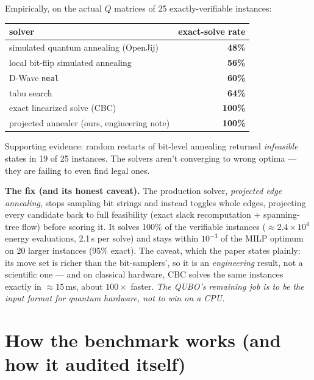 \documentclass[11pt]{article}
\newenvironment{card}{%
  \def\FrameCommand{\fboxsep=8pt\fcolorbox{cardline}{cardbg}}%
  \MakeFramed{\advance\hsize-\width\FrameRestore}\noindent}{\endMakeFramed}
\newcommand{\good}[1]{\textcolor{goodg}{\textbf{#1}}}
\newcommand{\bad}[1]{\textcolor{badr}{\textbf{#1}}}
\newcommand{\code}[1]{\texttt{#1}}
\begin{document}
Empirically, on the actual $Q$ matrices of 25 exactly-verifiable instances:

\begin{center}
\begin{tabular}{lr}
\toprule
solver & exact-solve rate \\
\midrule
simulated quantum annealing (OpenJij) & \bad{48\%} \\
local bit-flip simulated annealing & \bad{56\%} \\
D-Wave \code{neal} & \bad{60\%} \\
tabu search & \bad{64\%} \\
exact linearized solve (CBC) & \good{100\%} \\
projected annealer (ours, engineering note) & \good{100\%} \\
\bottomrule
\end{tabular}
\end{center}

Supporting evidence: random restarts of bit-level annealing returned
\emph{infeasible} states in 19 of 25 instances. The solvers aren't
converging to wrong optima --- they are failing to even find legal ones.

\begin{card}
\textbf{The fix (and its honest caveat).} The production solver,
\emph{projected edge annealing}, stops sampling bit strings and instead
toggles whole edges, projecting every candidate back to full feasibility
(exact slack recomputation + spanning-tree flow) before scoring it.
It solves 100\% of the verifiable instances ($\approx 2.4\times10^4$
energy evaluations, 2.1\,s per solve) and stays within $10^{-3}$ of the
MILP optimum on 20 larger instances (95\% exact). The caveat, which the
paper states plainly: its move set is richer than the bit-samplers', so it
is an \emph{engineering} result, not a scientific one --- and on classical
hardware, CBC solves the same instances exactly in $\approx 15$\,ms, about
$100\times$ faster. \emph{The QUBO's remaining job is to be the input
format for quantum hardware, not to win on a CPU.}
\end{card}

\section{How the benchmark works (and how it audited itself)}
\end{document}
